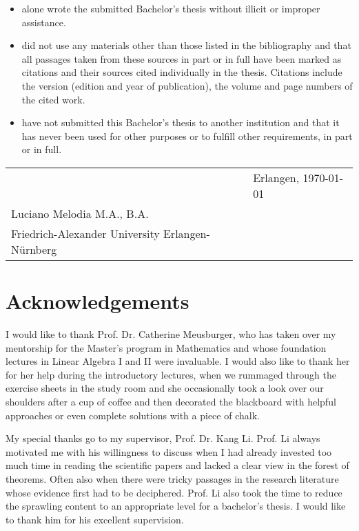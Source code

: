 \documentclass[b5paper, 11pt, twoside]{report}
\begin{document}
	\begin{itemize}
		\item alone wrote the submitted Bachelor's thesis without illicit or improper
			assistance.

		\item did not use any materials other than those listed in the bibliography and
			that all passages taken from these sources in part or in full have been marked
			as citations and their sources cited individually in the thesis. Citations
			include the version (edition and year of publication), the volume and page
			numbers of the cited work.

		\item have not submitted this Bachelor's thesis to another institution and that
			it has never been used for other purposes or to fulfill other requirements,
			in part or in full.
	\end{itemize}

	\vspace{2cm}
	\begin{tabular}{@{}p{3.5in}p{2in}p{2in}@{}}
		\hrulefill                                      &  & Erlangen, \today \\
		Luciano Melodia M.A., B.A.                      &  &                  \\
		Friedrich-Alexander University Erlangen-Nürnberg
	\end{tabular}

	\chapter*{Acknowledgements}

	I would like to thank Prof. Dr. Catherine Meusburger, who has taken over my
	mentorship for the Master's program in Mathematics and whose foundation
	lectures in Linear Algebra I and II were invaluable. I would also like to thank
	her for her help during the introductory lectures, when we rummaged through
	the exercise sheets in the study room and she occasionally took a look over
	our shoulders after a cup of coffee and then decorated the blackboard with
	helpful approaches or even complete solutions with a piece of chalk.

	My special thanks go to my supervisor, Prof. Dr. Kang Li. Prof. Li always motivated
	me with his willingness to discuss when I had already invested too much time in
	reading the scientific papers and lacked a clear view in the forest of theorems.
	Often also when there were tricky passages in the research literature whose
	evidence first had to be deciphered. Prof. Li also took the time to reduce the
	sprawling content to an appropriate level for a bachelor's thesis. I would like
	to thank him for his excellent supervision.
\end{document}
